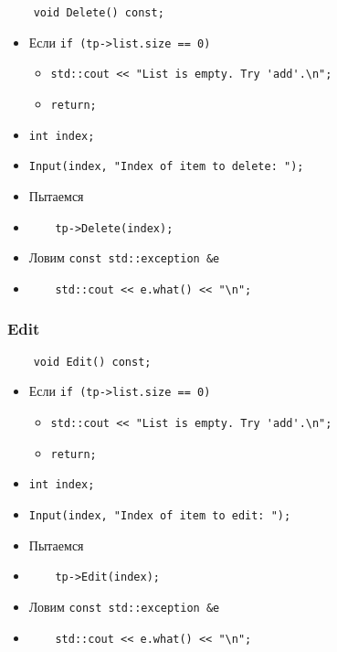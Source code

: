 \begin{lstlisting}
    void Delete() const;
\end{lstlisting}

\begin{itemize}
	\item Если \verb|if (tp->list.size == 0)|
	\begin{itemize}
		\item \verb|std::cout << "List is empty. Try 'add'.\n";|
		\item \verb|return;|
	\end{itemize}
	\item \verb|int index;|
	\item \verb|Input(index, "Index of item to delete: ");|
	\item Пытаемся
	\item \verb|    tp->Delete(index);|
	\item Ловим \verb|const std::exception &e|
	\item \verb|    std::cout << e.what() << "\n";|
\end{itemize}



\subsubsection*{Edit}

\begin{lstlisting}
    void Edit() const;
\end{lstlisting}

\begin{itemize}
	\item Если \verb|if (tp->list.size == 0)|
	\begin{itemize}
		\item \verb|std::cout << "List is empty. Try 'add'.\n";|
		\item \verb|return;|
	\end{itemize}
	\item \verb|int index;|
	\item \verb|Input(index, "Index of item to edit: ");|
	\item Пытаемся
	\item \verb|    tp->Edit(index);|
	\item Ловим \verb|const std::exception &e|
	\item \verb|    std::cout << e.what() << "\n";|
\end{itemize}



